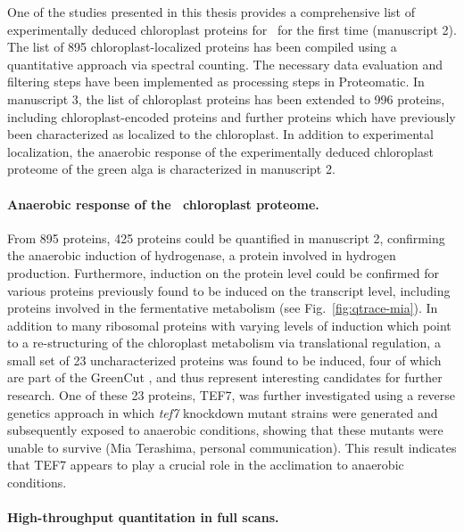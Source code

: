 One of the studies presented in this thesis provides a comprehensive list of 
experimentally deduced chloroplast proteins for \cre~for the first time
(manuscript 2).
The list of 895 chloroplast-localized proteins has been compiled using
a quantitative approach via spectral counting.
The necessary data evaluation and filtering steps have been implemented
as processing steps in Proteomatic.
In manuscript 3, the list of chloroplast proteins has been extended 
to 996 proteins, including chloroplast-encoded proteins and further proteins
which have previously been characterized as localized to the chloroplast.
In addition to experimental localization, the anaerobic response of the 
experimentally deduced chloroplast proteome of the green alga is characterized 
in manuscript 2. 

\paragraph{Anaerobic response of the \cre~chloroplast proteome.}

From 895 proteins, 425 proteins could be quantified in manuscript 2, 
confirming the anaerobic induction of hydrogenase, a protein involved in 
hydrogen production.
Furthermore, induction on the protein level could be confirmed for various 
proteins previously found to be induced on the transcript level,
including proteins involved in the fermentative metabolism 
(see Fig.~\ref{fig:qtrace-mia}).
In addition to many ribosomal proteins with varying levels of induction
which point to a re-structuring of the chloroplast metabolism via translational 
regulation, a small set of 23 uncharacterized proteins was found to be induced,
four of which are part of the GreenCut \citep{Grossman2010}, and thus represent 
interesting candidates for further research.
One of these 23 proteins, TEF7, was further investigated using a reverse 
genetics approach in which {\em tef7} knockdown mutant strains were generated
and subsequently exposed to anaerobic conditions, showing that these mutants 
were unable to survive (Mia Terashima, personal communication).
This result indicates that TEF7 appears to play a crucial role in the 
acclimation to anaerobic conditions.

\paragraph{High-throughput quantitation in full scans.}

